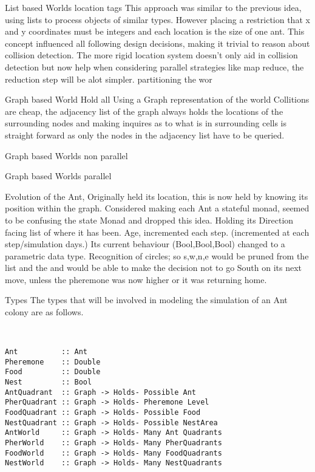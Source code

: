 \documentclass[main.tex]{subfiles}
\begin{document}
List based Worlds location tags
This approach was similar to the previous idea, using lists to process objects of similar types. However placing a restriction that x and y coordinates must be integers and each location is the size of one ant. This concept influenced all following design decisions, making it trivial to reason about collision detection. The more rigid location system doesn't only aid in collision detection but now help when considering parallel strategies like map reduce, the reduction step will be alot simpler. partitioning the wor

Graph based World Hold all
Using a Graph representation of the world Collitions are cheap, the adjacency list of the graph always holds the locations of the surrounding nodes and making inquires as to what is in surrounding cells is straight forward as only the nodes in the adjacency list have to be queried.

Graph based Worlds non parallel

Graph based Worlds parallel

Evolution of the Ant,
Originally held its location, this is now held by knowing its position within the graph. Considered making each Ant a stateful monad, seemed to be confusing the state Monad and dropped this idea.
Holding its Direction facing
list of where it has been.
Age, incremented each step. (incremented at each step/simulation days.)
Its current behaviour (Bool,Bool,Bool) changed to a parametric data type.
Recognition of circles; so s,w,n,e would be pruned from the list and the and would be able to make the decision not to go South on its next move, unless the pheremone was now higher or it was returning home.

Types
The types that will be involved in modeling the simulation of an Ant colony are as follows.

\begin{lstlisting}


Ant          :: Ant
Pheremone    :: Double
Food         :: Double
Nest         :: Bool
AntQuadrant  :: Graph -> Holds- Possible Ant
PherQuadrant :: Graph -> Holds- Pheremone Level
FoodQuadrant :: Graph -> Holds- Possible Food
NestQuadrant :: Graph -> Holds- Possible NestArea
AntWorld     :: Graph -> Holds- Many Ant Quadrants
PherWorld    :: Graph -> Holds- Many PherQuadrants
FoodWorld    :: Graph -> Holds- Many FoodQuadrants
NestWorld    :: Graph -> Holds- Many NestQuadrants

\end{lstlisting}
\end{document}
